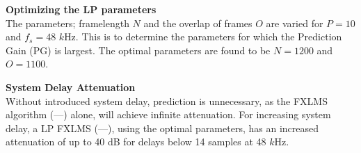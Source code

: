 \large

\begin{minipage}{.43\columnwidth}
 \textbf{Optimizing the LP parameters}\\
The parameters; framelength $N$ and the overlap of frames $O$ are varied for $P=10$ and $f_s=48$ $k$Hz. This is to determine the parameters for which the Prediction Gain (PG) is largest. 
 	The optimal parameters are found to be $N=1200$ and $O=1100$.
	\label{fig:HammingNOP10}
\end{minipage}%
\hspace{4mm}
\begin{minipage}[]{0.5\columnwidth}
	
\end{minipage}

\vspace{4mm}
\begin{minipage}{.43\columnwidth}
	\textbf{System Delay Attenuation}\\
Without introduced system delay, prediction is unnecessary, as the FXLMS algorithm (\textcolor{MATLABblue}{---}) alone, will achieve infinite attenuation. For increasing system delay, a LP FXLMS (\textcolor{MATLABred}{---}), using the optimal parameters, has an increased attenuation of up to 40 dB for delays below 14 samples at 48 $k$Hz.

\end{minipage}%
\hspace{4mm}
\begin{minipage}{0.5\columnwidth}
	
\end{minipage}
\vspace{4mm}

